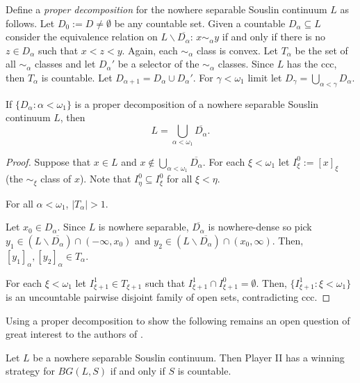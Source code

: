 Define a \emph{proper decomposition} for the nowhere separable Souslin continuum $L$ as follows.
Let $D_0:=D\neq\emptyset$ be any countable set.
Given a countable $D_\alpha\subseteq L$ consider the equivalence relation on $L\backslash\overline{D_\alpha}$:
$x\sim_\alpha y$ if and only if there is no $z\in D_\alpha$ such that $x<z<y$.
Again, each $\sim_\alpha$ class is convex.
Let $T_\alpha$ be the set of all $\sim_\alpha$ classes and let $D_\alpha'$ be a selector of the $\sim_\alpha$ classes.
Since $L$ has the ccc, then $T_\alpha$ is countable.
Let $D_{\alpha+1}=D_\alpha\cup D_\alpha'$.
For $\gamma<\omega_1$ limit let $D_\gamma=\bigcup_{\alpha<\gamma}D_\alpha$.

\begin{lemma}
    If $\{D_\alpha:\alpha<\omega_1\}$ is a proper decomposition of a nowhere separable Souslin continuum $L$, then $$L=\bigcup_{\alpha<\omega_1}\overline{D_\alpha}.$$
\end{lemma}

\begin{proof}
    Suppose that $x\in L$ and $x\notin \bigcup_{\alpha<\omega_1}\overline{D_\alpha}$.
    For each $\xi<\omega_1$ let $I_\xi^0:=[x]_\xi$ (the $\sim_\xi$ class of $x$).
    Note that $I_\eta^0\subseteq I_\xi^0$ for all $\xi<\eta$.
    \begin{claim}
        For all $\alpha<\omega_1$, $|T_\alpha|>1$.
    \end{claim}
    \begin{claimproof}
        Let $x_0\in D_\alpha$.
        Since $L$ is nowhere separable, $\overline{D_\alpha}$ is nowhere-dense so pick $y_1\in (L\backslash\overline{D_\alpha})\cap (-\infty, x_0)$ and $y_2\in (L\backslash\overline{D_\alpha})\cap (x_0,\infty)$.
        Then, $[y_1]_\alpha,[y_2]_\alpha\in T_\alpha$.
    \end{claimproof}
    For each $\xi<\omega_1$ let $I_{\xi+1}^1\in T_{\xi+1}$ such that $I_{\xi+1}^1\cap I_{\xi+1}^0=\emptyset$.
    Then, $\{I_{\xi+1}^1:\xi<\omega_1\}$ is an uncountable pairwise disjoint family of open sets, contradicting ccc.
\end{proof}

Using a proper decomposition to show the following remains an open question of great interest to the authors of \cite{MatosWiederholdSalvetti2025}.

\begin{conjecture}
    Let $L$ be a nowhere separable Souslin continuum.
    Then Player II has a winning strategy for $BG(L,S)$ if and only if $S$ is countable.
\end{conjecture}
